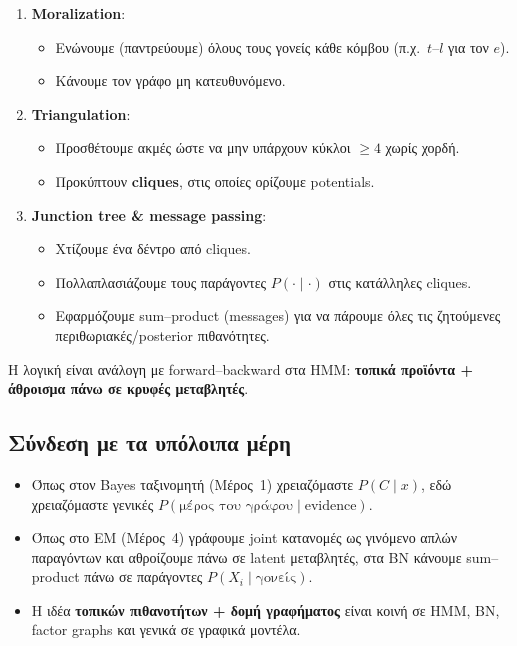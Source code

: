 \documentclass[a4paper,11pt]{article}
\begin{document}
\begin{enumerate}
  \item \textbf{Moralization}:
        \begin{itemize}
          \item Ενώνουμε (παντρεύουμε) όλους τους γονείς κάθε κόμβου
                (π.χ.\ $t$–$l$ για τον $e$).
          \item Κάνουμε τον γράφο μη κατευθυνόμενο.
        \end{itemize}
  \item \textbf{Triangulation}:
        \begin{itemize}
          \item Προσθέτουμε ακμές ώστε να μην υπάρχουν κύκλοι $\ge 4$
                χωρίς χορδή.
          \item Προκύπτουν \textbf{cliques}, στις οποίες ορίζουμε potentials.
        \end{itemize}
  \item \textbf{Junction tree \& message passing}:
        \begin{itemize}
          \item Χτίζουμε ένα δέντρο από cliques.
          \item Πολλαπλασιάζουμε τους παράγοντες $P(\cdot\mid\cdot)$
                στις κατάλληλες cliques.
          \item Εφαρμόζουμε sum–product (messages) για να πάρουμε όλες τις
                ζητούμενες περιθωριακές/posterior πιθανότητες.
        \end{itemize}
\end{enumerate}

Η λογική είναι ανάλογη με forward–backward στα HMM:
\textbf{τοπικά προϊόντα + άθροισμα πάνω σε κρυφές μεταβλητές}.

\subsection{Σύνδεση με τα υπόλοιπα μέρη}

\begin{itemize}
  \item Όπως στον Bayes ταξινομητή (Μέρος~1) χρειαζόμαστε $P(C\mid x)$,
        εδώ χρειαζόμαστε γενικές $P(\text{μέρος του γράφου} \mid \text{evidence})$.
  \item Όπως στο EM (Μέρος~4) γράφουμε joint κατανομές ως γινόμενο
        απλών παραγόντων και αθροίζουμε πάνω σε latent μεταβλητές,
        στα BN κάνουμε sum–product πάνω σε παράγοντες $P(X_i\mid \text{γονείς})$.
  \item Η ιδέα \textbf{τοπικών πιθανοτήτων + δομή γραφήματος}
        είναι κοινή σε HMM, BN, factor graphs και γενικά σε γραφικά μοντέλα.
\end{itemize}
\end{document}

